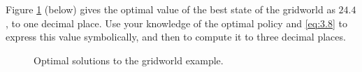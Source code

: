 
\begin{exercise}[Exercise 3.24]

Figure \ref{fig:3.5} (below) gives the optimal value of the best state of the gridworld as $24.4$, to one decimal place.
Use your knowledge of the optimal policy and \eqref{eq:3.8} to express this value symbolically, and then to compute it to three decimal places.

\setcounter{section}{3}
\setcounter{figure}{4}

\begin{figure}[H]
    \centering
    \hspace{1cm}
    \hspace{1cm}
    \hspace{0mm}
    \caption
    {
        Optimal solutions to the gridworld example.
    }
    \label{fig:3.5}
\end{figure}

\end{exercise}


